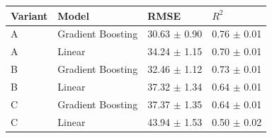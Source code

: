 \begin{tabular}{llll}
\toprule
Variant & Model & RMSE & $R^2$ \\
\midrule
A & Gradient Boosting & 30.63 $\pm$ 0.90 & 0.76 $\pm$ 0.01 \\
A & Linear & 34.24 $\pm$ 1.15 & 0.70 $\pm$ 0.01 \\
B & Gradient Boosting & 32.46 $\pm$ 1.12 & 0.73 $\pm$ 0.01 \\
B & Linear & 37.32 $\pm$ 1.34 & 0.64 $\pm$ 0.01 \\
C & Gradient Boosting & 37.37 $\pm$ 1.35 & 0.64 $\pm$ 0.01 \\
C & Linear & 43.94 $\pm$ 1.53 & 0.50 $\pm$ 0.02 \\
\bottomrule
\end{tabular}
